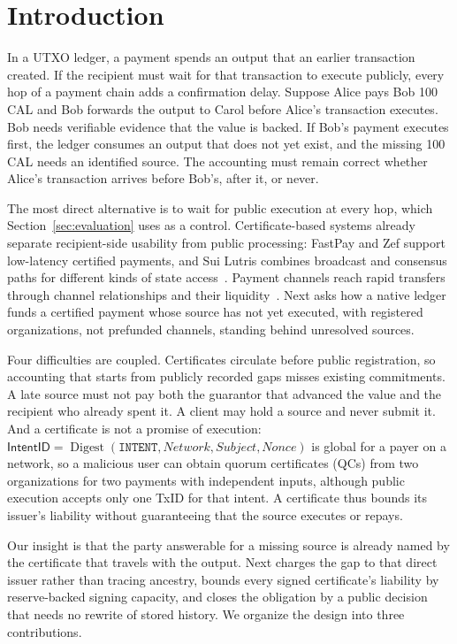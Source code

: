 \section{Introduction}
\label{sec:introduction}

In a UTXO ledger, a payment spends an output that an earlier transaction created. If the recipient must wait for that transaction to execute publicly, every hop of a payment chain adds a confirmation delay. Suppose Alice pays Bob 100 CAL and Bob forwards the output to Carol before Alice's transaction executes. Bob needs verifiable evidence that the value is backed. If Bob's payment executes first, the ledger consumes an output that does not yet exist, and the missing 100 CAL needs an identified source. The accounting must remain correct whether Alice's transaction arrives before Bob's, after it, or never.

The most direct alternative is to wait for public execution at every hop, which Section~\ref{sec:evaluation} uses as a control. Certificate-based systems already separate recipient-side usability from public processing: FastPay and Zef support low-latency certified payments, and Sui Lutris combines broadcast and consensus paths for different kinds of state access~\cite{fastpay,zef,lutris}. Payment channels reach rapid transfers through channel relationships and their liquidity~\cite{blitz,donner}. Next asks how a native ledger funds a certified payment whose source has not yet executed, with registered organizations, not prefunded channels, standing behind unresolved sources.

Four difficulties are coupled. Certificates circulate before public registration, so accounting that starts from publicly recorded gaps misses existing commitments. A late source must not pay both the guarantor that advanced the value and the recipient who already spent it. A client may hold a source and never submit it. And a certificate is not a promise of execution: $\mathsf{IntentID}=\operatorname{Digest}(\texttt{INTENT},\mathit{Network},\mathit{Subject},\mathit{Nonce})$ is global for a payer on a network, so a malicious user can obtain quorum certificates (QCs) from two organizations for two payments with independent inputs, although public execution accepts only one TxID for that intent. A certificate thus bounds its issuer's liability without guaranteeing that the source executes or repays.

Our insight is that the party answerable for a missing source is already named by the certificate that travels with the output. Next charges the gap to that direct issuer rather than tracing ancestry, bounds every signed certificate's liability by reserve-backed signing capacity, and closes the obligation by a public decision that needs no rewrite of stored history. We organize the design into three contributions.

